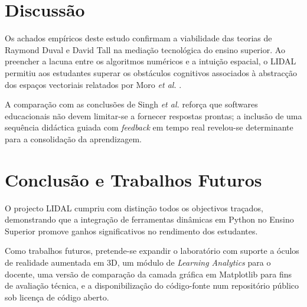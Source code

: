 \documentclass[conference]{IEEEtran}
\begin{document}
\section{Discussão}

Os achados empíricos deste estudo confirmam a viabilidade das teorias de Raymond Duval \cite{duval1995} e David Tall \cite{tall2004} na mediação tecnológica do ensino superior. Ao preencher a lacuna entre os algoritmos numéricos e a intuição espacial, o LIDAL permitiu aos estudantes superar os obstáculos cognitivos associados à abstracção dos espaços vectoriais relatados por Moro \textit{et al.} \cite{moro2016}.

A comparação com as conclusões de Singh \textit{et al.} \cite{singh2021} reforça que softwares educacionais não devem limitar-se a fornecer respostas prontas; a inclusão de uma sequência didáctica guiada com \textit{feedback} em tempo real revelou-se determinante para a consolidação da aprendizagem.

\section{Conclusão e Trabalhos Futuros}

O projecto LIDAL cumpriu com distinção todos os objectivos traçados, demonstrando que a integração de ferramentas dinâmicas em Python no Ensino Superior promove ganhos significativos no rendimento dos estudantes.

Como trabalhos futuros, pretende-se expandir o laboratório com suporte a óculos de realidade aumentada em 3D, um módulo de \textit{Learning Analytics} para o docente, uma versão de comparação da camada gráfica em Matplotlib para fins de avaliação técnica, e a disponibilização do código-fonte num repositório público sob licença de código aberto.
\end{document}
